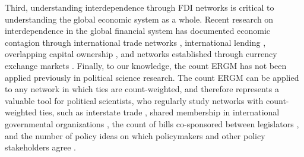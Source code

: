 \documentclass[reqno,onecolumn,letterpaper,12pt]{article}
\begin{document}
Third, understanding interdependence through FDI networks is critical to understanding the global economic system as a whole.  Recent research on interdependence in the global financial system has documented economic contagion through international trade networks \citep{kali2010financial,schiavo2010international},  international lending \citep{gai2010contagion,zakaria2017evidence}, overlapping capital ownership \citep{chuluun2017global}, and networks established through currency exchange markets \citep{brida2009symbolic,matesanz2014network}. %
Finally, to our knowledge, the count ERGM has not been applied previously in political science research. The count ERGM can be applied to any network in which ties are count-weighted, and therefore represents a valuable tool for political scientists, who regularly study networks with count-weighted ties, such as interstate trade \citep{ward2007persistent}, shared membership in international governmental organizations \citep{boehmke2016addressing}, the count of bills co-sponsored between legislators \citep{kirkland2013hypothesis}, and the number of policy ideas on which policymakers and other policy stakeholders agree \citep{leifeld2013reconceptualizing}.


\end{document}
